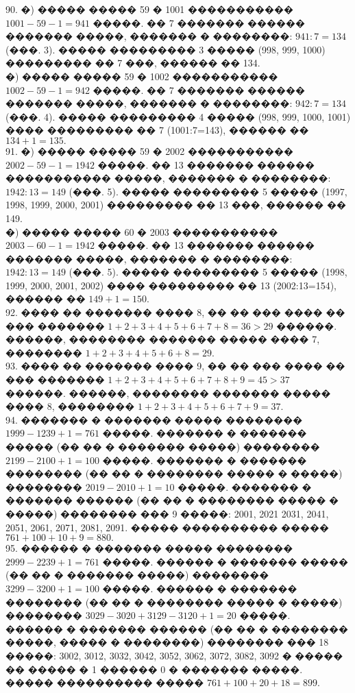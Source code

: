 \documentclass[12pt]{article}
\begin{document}
90. �) ����� ����� 59 � 1001 ����������� $1001-59-1=941$ �����. �� 7 ������� ������ ������� �����, ������� � ��������: $941:7=134$ (���. 3). ����� ��������� 3 ����� (998, 999, 1000) ��������� �� 7 ���, ������ �� 134.\\
�) ����� ����� 59 � 1002 ����������� $1002-59-1=942$ �����. �� 7 ������� ������ ������� �����, ������� � ��������: $942:7=134$ (���. 4). ����� ��������� 4 ����� (998, 999, 1000, 1001) ���� ��������� �� 7 (1001:7=143), ������ �� $134+1=135.$\\
91. �) ����� ����� 59 � 2002 ����������� $2002-59-1=1942$ �����. �� 13 ������� ������ ����������� �����, ������� � ��������: $1942:13=149$ (���. 5). ����� ��������� 5 ����� (1997, 1998, 1999, 2000, 2001) ��������� �� 13 ���, ������ �� 149.\\
�) ����� ����� 60 � 2003 ����������� $2003-60-1=1942$ �����. �� 13 ������� ������ ������� �����, ������� � ��������: $1942:13=149$ (���. 5). ����� ��������� 5 ����� (1998, 1999, 2000, 2001, 2002) ���� ��������� �� 13 (2002:13=154), ������ �� $149+1=150.$\\
92. ���� �� ������� ���� 8, �� �� ��� ���� �� ��� ������� $1+2+3+4+5+6+7+8=36>29$ ������. ������, �������� ������� ����� ���� 7, �������� $1+2+3+4+5+6+8=29.$\\
93. ���� �� ������� ���� 9, �� �� ��� ���� �� ��� ������� $1+2+3+4+5+6+7+8+9=45>37$ ������. ������, �������� ������� ����� ���� 8, �������� $1+2+3+4+5+6+7+9=37.$\\
94. ������� � ������� ����� �������� $1999-1239+1=761$ �����. ������� � ������� ����� (�� �� � ������� �����) �������� $2199-2100+1=100$ �����. ������� � ������� �������� (�� �� � �������� ����� � �����) �������� $2019-2010+1=10$ �����. ������� � ������� ������ (�� �� � �������� ����� � �����) �������� ��� 9 �����: 2001, 2021 2031, 2041, 2051, 2061, 2071, 2081, 2091. ����� ���������� ����� $761+100+10+9=880.$\\
95. ������ � ������� ����� �������� $2999-2239+1=761$ �����. ������ � ������� ����� (�� �� � ������� �����) �������� $3299-3200+1=100$ �����. ������ � ������� �������� (�� �� � �������� ����� � �����) �������� $3029-3020+3129-3120+1=20$ �����. ������ � ������� ������ (�� �� � �������� �����, ����� � ��������) �������� ��� 18 �����: 3002, 3012, 3032, 3042, 3052, 3062, 3072, 3082, 3092 � ����� �� ����� � 1 ������ 0 � ������� �����. ����� ���������� ����� $761+100+20+18=899.$\\
\end{document}
